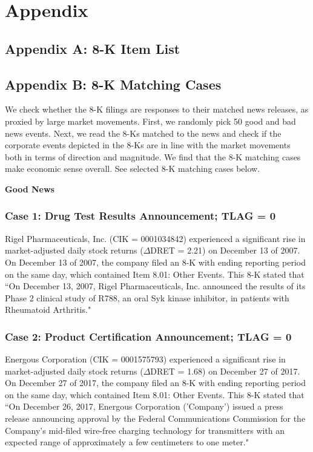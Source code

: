 \section*{Appendix}
\subsection*{Appendix A: 8-K Item List}
\label{appa}


\newpage
\subsection*{Appendix B: 8-K Matching Cases}
\label{appb}
We check whether the 8-K filings are responses to their matched news releases, as proxied by large market movements. First, we randomly pick 50 good and bad news events. Next, we read the 8-Ks matched to the news and check if the corporate events depicted in the 8-Ks are in line with the market movements both in terms of direction and magnitude. We find that the 8-K matching cases make economic sense overall. See selected 8-K matching cases below.
\begin{center}
	\textbf{Good News}
\end{center}
\subsubsection*{Case 1: Drug Test Results Announcement; TLAG = 0}
Rigel Pharmaceuticals, Inc. (CIK = 0001034842) experienced a significant rise in market-adjusted daily stock returns ($\Delta$DRET = 2.21) on December 13 of 2007. On December 13 of 2007, the company filed an 8-K with ending reporting period on the same day, which contained Item 8.01: Other Events. This 8-K stated that ``On December 13, 2007, Rigel Pharmaceuticals, Inc. announced the results of its Phase 2 clinical study of R788, an oral Syk kinase inhibitor, in patients with Rheumatoid Arthritis." 
\subsubsection*{Case 2: Product Certification Announcement; TLAG = 0}
Energous Corporation (CIK = 0001575793) experienced a significant rise in market-adjusted daily stock returns ($\Delta$DRET = 1.68) on December 27 of 2017. On December 27 of 2017, the company filed an 8-K with ending reporting period on the same day, which contained Item 8.01: Other Events. This 8-K stated that ``On December 26, 2017, Energous Corporation ('Company') issued a press release announcing approval by the Federal Communications Commission for the Company’s mid-filed wire-free charging technology for transmitters with an expected range of approximately a few centimeters to one meter."
